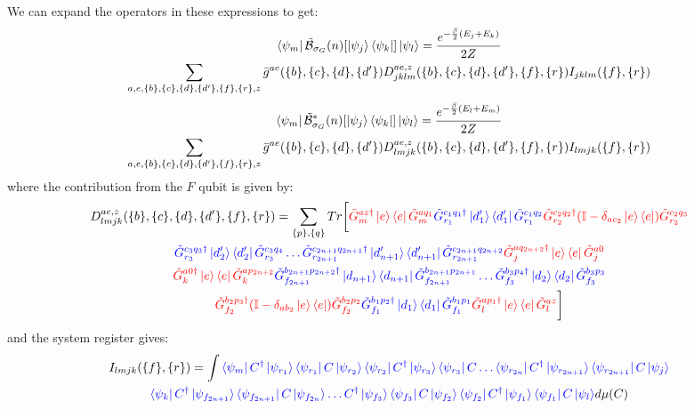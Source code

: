 \documentclass[aps,floatfix,10pt,amssymb,amsfont,amsmath,superscriptaddress,float,nofootinbib,longbibliography,nobalancelastpage,twocolumn]{revtex4-2}
\begin{document}
We can expand the operators in these expressions to get:
\begin{multline}
    \bra{\psi_m}\tilde{\mathcal{B}}_{\sigma_G}(n)[\ket{\psi_j}\bra{\psi_k}]\ket{\psi_l} = \frac{e^{-\frac{\beta}{2}(E_j+E_k)}}{2Z}\\\sum_{a,e,\{b\},\{c\},\{d\},\{d'\},\{f\},\{r\},z} \bar g^{ae}(\{b\},\{c\},\{d\},\{d'\}) D^{ae,z}_{jklm}(\{b\},\{c\},\{d\},\{d'\},\{f\},\{r\})I_{jklm}(\{f\},\{r\})
    \label{eq:def}
\end{multline}
\begin{multline}
    \bra{\psi_m}\tilde{\mathcal{B}}^*_{\sigma_G}(n)[\ket{\psi_j}\bra{\psi_k}]\ket{\psi_l} = \frac{e^{-\frac{\beta}{2}(E_l+E_m)}}{2Z}\\\sum_{a,e,\{b\},\{c\},\{d\},\{d'\},\{f\},\{r\},z} \bar g^{ae}(\{b\},\{c\},\{d\},\{d'\}) D^{ae,z}_{lmjk}(\{b\},\{c\},\{d\},\{d'\},\{f\},\{r\})I_{lmjk}(\{f\},\{r\})
    \label{eq:B*def}
\end{multline}
where the contribution from the $F$ qubit is given by:
\begin{multline}
    D^{ae,z}_{lmjk}(\{b\},\{c\},\{d\},\{d'\},\{f\},\{r\}) = 
    \sum_{\{p\},\{q\}}
Tr\bigg[\textcolor{red}{\tilde G^{az\dagger}_m\ket{e}\bra{e}\tilde G^{aq_1}_m}\textcolor{blue}{\tilde G^{c_1q_1\dagger}_{r_1}\ket{d'_1}\bra{d'_1}\tilde G^{c_1q_2}_{r_1}}\textcolor{red}{\tilde G^{c_2q_2\dagger}_{r_2}(\mathbb{I} - \delta_{ac_2}\ket{e}\bra{e})\tilde G^{c_2q_3}_{r_2}}\\\textcolor{blue}{\tilde G^{c_3q_3\dagger}_{r_3}\ket{d'_2}\bra{d'_2}\tilde G^{c_3q_4}_{r_3}\ldots
\tilde G^{c_{2n+1}q_{2n+1}\dagger}_{r_{2n+1}}\ket{d'_{n+1}}\bra{d'_{n+1}}\tilde G^{c_{2n+1}q_{2n+2}}_{r_{2n+1}}}\textcolor{red}{\tilde G^{aq_{2n+2}\dagger}_j\ket{e}\bra{e}\tilde G^{a0}_j}\\ \textcolor{red}{\tilde G^{a0\dagger}_k\ket{e}\bra{e}\tilde G^{ap_{2n+2}}_k}\textcolor{blue}{\tilde G^{b_{2n+1}p_{2n+2}\dagger}_{f_{2n+1}}\ket{d_{n+1}}\bra{d_{n+1}}\tilde G^{b_{2n+1}p_{2n+1}}_{f_{2n+1}}\ldots \tilde G^{b_3p_4\dagger}_{f_3}\ket{d_2}\bra{d_2}\tilde G^{b_3p_3}_{f_3}}\\\textcolor{red}{\tilde G^{b_2p_3\dagger}_{f_2}(\mathbb{I} - \delta_{ab_2}\ket{e}\bra{e})\tilde G^{b_2p_2}_{f_2}}\textcolor{blue}{\tilde G^{b_1p_2\dagger}_{f_1}\ket{d_1}\bra{d_1}\tilde G^{b_1p_1}_{f_1}}\textcolor{red}{\tilde G^{ap_1\dagger}_l\ket{e}\bra{e}\tilde G^{az}_l}\bigg]
\end{multline}
and the system register gives:
\begin{multline}
I_{lmjk}(\{f\},\{r\})=\int \textcolor{blue}{\bra{\psi_m}C^{\dagger}\ket{\psi_{r_1}}\bra{\psi_{r_1}}C\ket{\psi_{r_2}}\bra{\psi_{r_2}}C^{\dagger}\ket{\psi_{r_3}}\bra{\psi_{r_3}}C\ldots \bra{\psi_{r_{2n}}}C^{\dagger}\ket{\psi_{r_{2n+1}}}\bra{\psi_{r_{2n+1}}}C\ket{\psi_{j}}}\\\textcolor{blue}{
\bra{\psi_{k}}C^{\dagger}\ket{\psi_{f_{2n+1}}}\bra{\psi_{f_{2n+1}}}C\ket{\psi_{f_{2n}}}\ldots C^{\dagger}\ket{\psi_{f_3}}\bra{\psi_{f_3}}C\ket{\psi_{f_2}}\bra{\psi_{f_2}}C^{\dagger}\ket{\psi_{f_1}}\bra{\psi_{f_1}}C\ket{\psi_l}}d\mu(C)
\end{multline}
\end{document}
